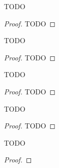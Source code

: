 \begin{theorem}
  \label{bricard_condition}
  TODO
\end{theorem}
\begin{proof}
  TODO
\end{proof}

\begin{theorem}[Example 1]
  \label{example1}
  TODO
\end{theorem}
\begin{proof}
    TODO
\end{proof}

\begin{theorem}[Example 2]
  \label{example2}
  TODO
\end{theorem}
\begin{proof}
    TODO
\end{proof}

\begin{theorem}[Example 3]
  \label{example2}
  TODO
\end{theorem}
\begin{proof}
    TODO
\end{proof}

\begin{theorem}
  \label{hilberts_third}
  TODO
\end{theorem}
\begin{proof}
\end{proof}
